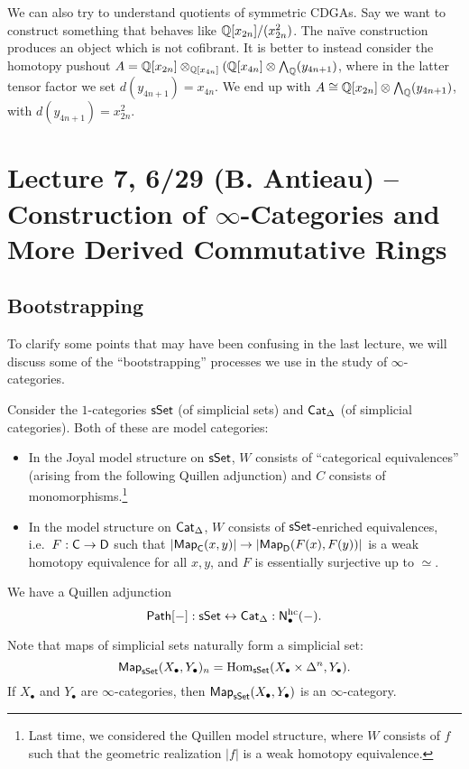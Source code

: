 \documentclass{amsart}
\begin{document}
\begin{ex}
	We can also try to understand quotients of symmetric CDGAs.
	Say we want to construct something that behaves like $\mathbb{Q}[x_{2n}] / (x_{2n}^2)$.
	The na\"ive construction produces an object which is not cofibrant.
	It is better to instead consider the homotopy pushout $A = \mathbb{Q}[x_{2n}] \otimes_{\mathbb{Q}[x_{4n}]} (\mathbb{Q}[x_{4n}] \otimes \bigwedge_{\mathbb{Q}} (y_{4n+1})$, where in the latter tensor factor we set $d(y_{4n+1}) = x_{4n}$.
	We end up with $A \cong \mathbb{Q}[x_{2n}] \otimes \bigwedge_{\mathbb{Q}}(y_{4n+1})$, with $d(y_{4n+1}) = x_{2n}^2$.
\end{ex}

\section{Lecture 7, 6/29 (B. Antieau) -- Construction of $\infty$-Categories and More Derived Commutative Rings}

\subsection{Bootstrapping}

To clarify some points that may have been confusing in the last lecture, we will discuss some of the ``bootstrapping'' processes we use in the study of $\infty$-categories.

Consider the $1$-categories $\mathsf{sSet}$ (of simplicial sets) and $\mathsf{Cat}_\Delta$ (of simplicial categories).
Both of these are model categories:
\begin{itemize}
	\item In the Joyal model structure on $\mathsf{sSet}$, $W$ consists of ``categorical equivalences'' (arising from the following Quillen adjunction) and $C$ consists of monomorphisms.\footnote{Last time, we considered the Quillen model structure, where $W$ consists of $f$ such that the geometric realization $|f|$ is a weak homotopy equivalence.}
	\item In the model structure on $\mathsf{Cat}_\Delta$, $W$ consists of $\mathsf{sSet}$-enriched equivalences, i.e.\ $F: \mathsf{C} \to \mathsf{D}$ such that $\left|\mathsf{Map}_{\mathsf{C}}(x, y)\right| \to \left|\mathsf{Map}_{\mathsf{D}}(F(x), F(y))\right|$ is a weak homotopy equivalence for all $x, y$, and $F$ is essentially surjective up to $\simeq$.
\end{itemize}
We have a Quillen adjunction 
\[
	\mathsf{Path}[-]: \mathsf{sSet} \leftrightarrow \mathsf{Cat}_\Delta :\mathsf{N}_\bullet^{\mathrm{hc}}(-).
\]

Note that maps of simplicial sets naturally form a simplicial set:
\[
	\mathsf{Map}_{\mathsf{sSet}}(X_\bullet, Y_\bullet)_n = \operatorname{Hom}_{\mathsf{sSet}}(X_\bullet \times \Delta^n, Y_\bullet).
\]
If $X_\bullet$ and $Y_\bullet$ are $\infty$-categories, then $\mathsf{Map}_{\mathsf{sSet}}(X_\bullet, Y_\bullet)$ is an $\infty$-category.
\end{document}
